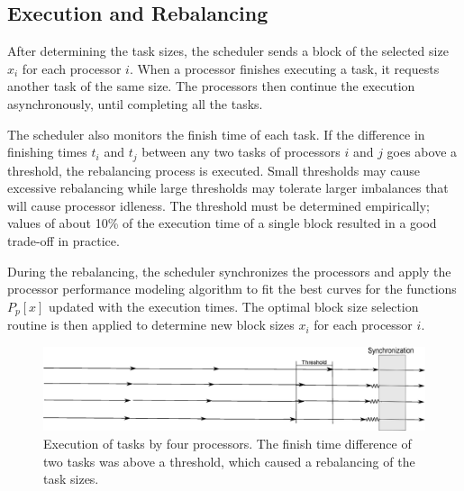 \documentclass[journal]{IEEEtran}
\begin{document}
\subsection{Execution and Rebalancing}
After determining the task sizes, the scheduler sends a block of the selected
size $x_i$ for each processor $i$. When a processor finishes executing a task,
it requests another task of the same size. The processors then continue the
execution asynchronously, until completing all the tasks.

The scheduler also monitors the finish time of each task. If the difference in
finishing times $t_i$ and $t_j$ between any two tasks of processors $i$ and $j$
goes above a threshold, the rebalancing process is executed. Small thresholds
may cause excessive rebalancing while large thresholds may tolerate larger
imbalances that will cause processor idleness. The threshold must be
determined empirically; values of about 10\% of the execution time of a single
block resulted in a good trade-off in practice.


During the rebalancing, the scheduler synchronizes the processors and apply the
processor performance modeling algorithm to fit the best curves for the
functions $P_p[x]$ updated with the execution times. The optimal block size
selection routine is then applied to determine new block sizes $x_i$ for each
processor $i$.

\begin{figure}[!t]
	\centering
			\includegraphics[scale=0.22]{DiagramaArtigo.eps}
	\caption{Execution of tasks by four processors. The finish time
         difference of two tasks was above a threshold, which caused a
          rebalancing of the task sizes.}
	\label{fig:Diagrama}
\end{figure}

\end{document}
